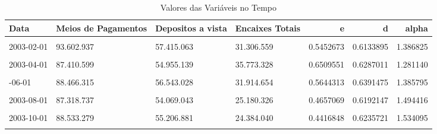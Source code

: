 \documentclass[12pt]{article}
\begin{document}
\begin{longtable}[t]{llllrrr}
\caption{\label{tab:unnamed-chunk-5}Valores das Variáveis no Tempo}\\
\toprule
Data & Meios de Pagamentos & Depositos a vista & Encaixes Totais & e & d & alpha\\
\midrule
\cellcolor{gray!10}{2003-01-01} & \cellcolor{gray!10}{94.977.783} & \cellcolor{gray!10}{58.027.664} & \cellcolor{gray!10}{27.420.138} & \cellcolor{gray!10}{0.4725356} & \cellcolor{gray!10}{0.6109604} & \cellcolor{gray!10}{1.475492}\\
2003-02-01 & 93.602.937 & 57.415.063 & 31.306.559 & 0.5452673 & 0.6133895 & 1.386825\\
\cellcolor{gray!10}{2003-03-01} & \cellcolor{gray!10}{89.822.584} & \cellcolor{gray!10}{56.687.240} & \cellcolor{gray!10}{32.897.112} & \cellcolor{gray!10}{0.5803266} & \cellcolor{gray!10}{0.6311023} & \cellcolor{gray!10}{1.360279}\\
2003-04-01 & 87.410.599 & 54.955.139 & 35.773.328 & 0.6509551 & 0.6287011 & 1.281140\\
\cellcolor{gray!10}{2003-05-01} & \cellcolor{gray!10}{86.231.763} & \cellcolor{gray!10}{53.712.908} & \cellcolor{gray!10}{32.594.739} & \cellcolor{gray!10}{0.6068325} & \cellcolor{gray!10}{0.6228901} & \cellcolor{gray!10}{1.324328}\\
\addlinespace
2003-06-01 & 88.466.315 & 56.543.028 & 31.914.654 & 0.5644313 & 0.6391475 & 1.385795\\
\cellcolor{gray!10}{2003-07-01} & \cellcolor{gray!10}{87.050.128} & \cellcolor{gray!10}{54.607.293} & \cellcolor{gray!10}{35.398.371} & \cellcolor{gray!10}{0.6482352} & \cellcolor{gray!10}{0.6273086} & \cellcolor{gray!10}{1.283145}\\
2003-08-01 & 87.318.737 & 54.069.043 & 25.180.326 & 0.4657069 & 0.6192147 & 1.494416\\
\cellcolor{gray!10}{2003-09-01} & \cellcolor{gray!10}{88.450.654} & \cellcolor{gray!10}{55.976.215} & \cellcolor{gray!10}{23.635.669} & \cellcolor{gray!10}{0.4222449} & \cellcolor{gray!10}{0.6328525} & \cellcolor{gray!10}{1.576376}\\
2003-10-01 & 88.533.279 & 55.206.881 & 24.384.040 & 0.4416848 & 0.6235721 & 1.534095\\
\addlinespace
\cellcolor{gray!10}{2003-11-01} & \cellcolor{gray!10}{95.230.124} & \cellcolor{gray!10}{60.000.748} & \cellcolor{gray!10}{27.187.991} & \cellcolor{gray!10}{0.4531275} & \cellcolor{gray!10}{0.6300606} & \cellcolor{gray!10}{1.525699}\\

\end{longtable}
\end{document}
